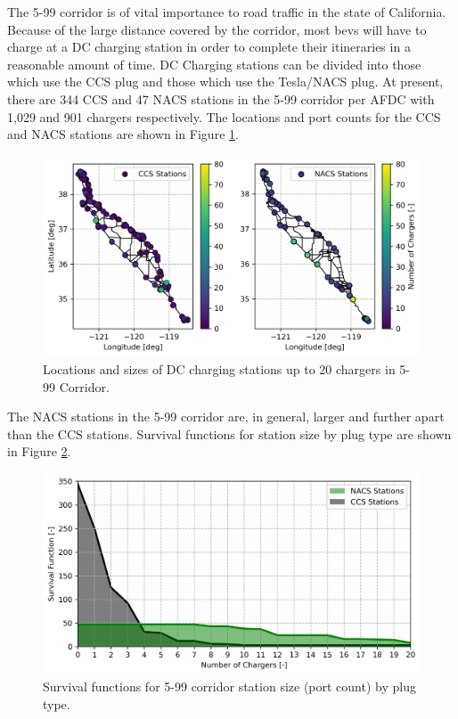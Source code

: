 The 5-99 corridor is of vital importance to road traffic in the state of California. Because of the large distance covered by the corridor, most \glspl{bev} will have to charge at a DC charging station in order to complete their itineraries in a reasonable amount of time. DC Charging stations can be divided into those which use the CCS plug and those which use the Tesla/NACS plug. At present, there are 344 CCS and 47 NACS stations in the 5-99 corridor per AFDC \citep{afdc_2023} with 1,029 and 901 chargers respectively. The locations and port counts for the CCS and NACS stations are shown in Figure \ref{fig:stations_corridor}.

\begin{figure}[H]
	\centering
	\includegraphics[width = \linewidth]{./figures/stations_corridor.png}
	\caption{Locations and sizes of DC charging stations up to 20 chargers in 5-99 Corridor.}
	\label{fig:stations_corridor}
\end{figure}

The NACS stations in the 5-99 corridor are, in general, larger and further apart than the CCS stations. Survival functions for station size by plug type are shown in Figure \ref{fig:stations_survival}.

\begin{figure}[H]
	\centering
	\includegraphics[width = \linewidth]{./figures/stations_survival.png}
	\caption{Survival functions for 5-99 corridor station size (port count) by plug type.}
	\label{fig:stations_survival}
\end{figure}

